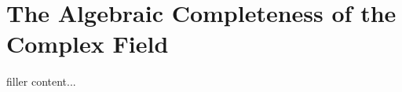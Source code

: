 \documentclass[../../templates/section]{subfiles}
\begin{document}
\section{The Algebraic Completeness of the Complex Field}\label{sec:the-algebraic-completeness-of-the-complex-field}

filler content...
\end{document}
